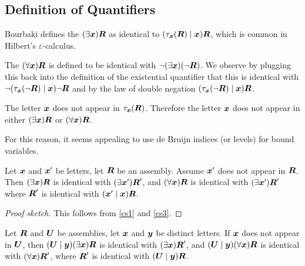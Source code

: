 \subsection{Definition of Quantifiers}

\begin{definition}
Bourbaki defines the  $(\exists\boldsymbol{x})\boldsymbol{R}$
as identical to $(\tau_{\boldsymbol{x}}(\boldsymbol{R})\mid\boldsymbol{x})\boldsymbol{R}$,
which is common in Hilbert's $\varepsilon$-calculus.

The 
$(\forall\boldsymbol{x})\boldsymbol{R}$ is defined to be identical
with $\neg(\exists\boldsymbol{x})(\neg\boldsymbol{R})$. We observe
by plugging this back into the definition of the existential quantifier
that this is identical with $\neg(\tau_{\boldsymbol{x}}(\neg\boldsymbol{R})\mid\boldsymbol{x})\neg\boldsymbol{R}$
and by the law of double negation $(\tau_{\boldsymbol{x}}(\neg\boldsymbol{R})\mid\boldsymbol{x})\boldsymbol{R}$.
\end{definition}

\begin{proposition}
The letter $\boldsymbol{x}$ does not appear in $\tau_{\boldsymbol{x}}(\boldsymbol{R})$.
Therefore the letter $\boldsymbol{x}$ does not appear in either
$(\exists\boldsymbol{x})\boldsymbol{R}$ or $(\forall\boldsymbol{x})\boldsymbol{R}$.

For this reason, it seems appealing to use de Bruijn indices (or levels) for bound variables.
\end{proposition}

\begin{cs}\label{cs8}%
Let $\boldsymbol{x}$ and $\boldsymbol{x}'$ be letters, let
$\boldsymbol{R}$ be an assembly. Assume $\boldsymbol{x}'$ does not
appear in $\boldsymbol{R}$. Then
$(\exists\boldsymbol{x})\boldsymbol{R}$ is identical with
$(\exists\boldsymbol{x}')\boldsymbol{R}'$, and
$(\forall\boldsymbol{x})\boldsymbol{R}$ is identical with
$(\exists\boldsymbol{x}')\boldsymbol{R}'$ where $\boldsymbol{R}'$
is identical with $(\boldsymbol{x}'\mid\boldsymbol{x})\boldsymbol{R}$.
\end{cs}

\begin{proof}[Proof sketch]
This follows from \ref{cs1} and \ref{cs3}.
\end{proof}

\begin{cs}\label{cs9}%
Let $\boldsymbol{R}$ and $\boldsymbol{U}$ be assemblies, let
$\boldsymbol{x}$ and $\boldsymbol{y}$ be distinct letters. If
$\boldsymbol{x}$ does not appear in $\boldsymbol{U}$, then
$(\boldsymbol{U}\mid\boldsymbol{y})(\exists\boldsymbol{x})\boldsymbol{R}$
is identical with $(\exists\boldsymbol{x})\boldsymbol{R}'$, and 
$(\boldsymbol{U}\mid\boldsymbol{y})(\forall\boldsymbol{x})\boldsymbol{R}$
is identical with $(\forall\boldsymbol{x})\boldsymbol{R}'$, where
$\boldsymbol{R}'$ is identical with $(\boldsymbol{U}\mid\boldsymbol{y})\boldsymbol{R}$.
\end{cs}

